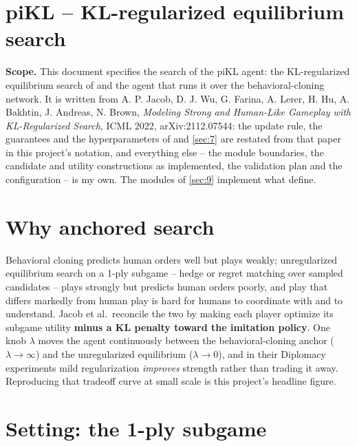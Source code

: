 \documentclass[12pt,a4paper]{article}
\begin{document}

\section*{piKL -- KL-regularized equilibrium search}

\textbf{Scope.}
This document specifies the search of the piKL agent: the KL-regularized equilibrium search of  and the agent that runs it over the behavioral-cloning network.
It is written from A. P. Jacob, D. J. Wu, G. Farina, A. Lerer, H. Hu, A. Bakhtin, J. Andreas, N. Brown, \emph{Modeling Strong and Human-Like Gameplay with KL-Regularized Search}, ICML 2022, arXiv:2112.07544: the update rule, the guarantees and the hyperparameters of  and \cref{sec:7} are restated from that paper in this project's notation, and everything else -- the module boundaries, the candidate and utility constructions as implemented, the validation plan and the configuration -- is my own.
The modules of \cref{sec:9} implement what  define.

\section{Why anchored search}\label{sec:1}

Behavioral cloning predicts human orders well but plays weakly; unregularized equilibrium search on a 1-ply subgame -- hedge or regret matching over sampled candidates -- plays strongly but predicts human orders poorly, and play that differs markedly from human play is hard for humans to coordinate with and to understand.
Jacob et al.\ reconcile the two by making each player optimize its subgame utility \textbf{minus a KL penalty toward the imitation policy}.
One knob $\lambda$ moves the agent continuously between the behavioral-cloning anchor ($\lambda \to \infty$) and the unregularized equilibrium ($\lambda \to 0$), and in their Diplomacy experiments mild regularization \emph{improves} strength rather than trading it away.
Reproducing that tradeoff curve at small scale is this project's headline figure.

\section{Setting: the 1-ply subgame}\label{sec:2}
\end{document}
